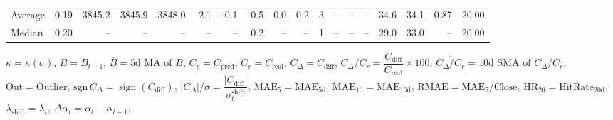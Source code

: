 \begin{threeparttable}
{\begin{tabular}{lrrrrrrrrrrrrrrrrr}
Average &     0.19 & 3845.2 & 3845.9 & 3848.0 &       -2.1 &           -0.1 &                      -0.5 &                      0.0 &                 0.2 &              3 &         -- &        -- &             -- &             34.6 &                34.1 &            0.87 &                  20.00 \\
 Median &     0.20 &     -- &     -- &     -- &         -- &             -- &                       0.2 &                       -- &                  -- &              1 &         -- &        -- &             -- &             29.0 &                33.0 &              -- &                  20.00 \\
\bottomrule
\end{tabular}
}
\begin{tablenotes}\footnotesize
\item $\kappa=\kappa(\sigma)$, $B=B_{t-1}$, $\overline{B}=\text{5d MA of }B$, $C_p=C_{\text{pred}}$, $C_r=C_{\text{real}}$, $C_\Delta=C_{\text{diff}}$, $C_\Delta/C_r=\dfrac{C_{\text{diff}}}{C_{\text{real}}}\times100$, $\overline{C_\Delta/C_r}=\text{10d SMA of }C_\Delta/C_r$, $\mathrm{Out}=\text{Outlier}$, $\mathrm{sgn}\,C_\Delta=\operatorname{sign}(C_{\text{diff}})$, $|C_\Delta|/\sigma=\dfrac{|C_{\text{diff}}|}{\sigma_t^{\text{shift}}}$, $\mathrm{MAE}_5=\mathrm{MAE}_{5\text{d}}$, $\mathrm{MAE}_{10}=\mathrm{MAE}_{10\text{d}}$, $\mathrm{RMAE}= \mathrm{MAE}_5 / \text{Close}$, $\mathrm{HR}_{20}=\mathrm{HitRate}_{20\text{d}}$, $\lambda_{\text{shift}}=\lambda_t$, $\Delta\alpha_t=\alpha_t-\alpha_{t-1}$.
\end{tablenotes}
\end{threeparttable}
\endgroup


